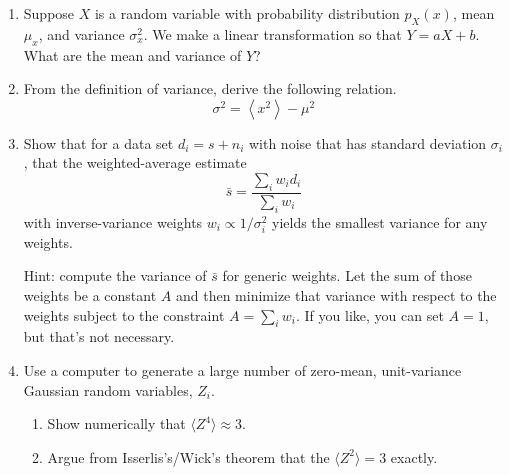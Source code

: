 \begin{enumerate}

\item Suppose $X$ is a random variable with probability distribution $p_X(x)$, mean $\mu_x$, and variance $\sigma_x^2$.  We make a linear transformation so that $Y = a X + b$.  What are the mean and variance of $Y$?

\item From the definition of variance, derive the following relation.
  \begin{equation}
    \sigma^2 = \left\langle x^2\right\rangle - \mu^2  \label{eq:var_alt}
  \end{equation}
 
\item \label{ex:minvar_est} Show that for a data set $d_i = s + n_i$ with noise that has standard deviation $\sigma_i$, that the weighted-average estimate
  \begin{equation*}
    \bar s = \frac{\sum_i w_i d_i}{\sum_i w_i}
  \end{equation*}
with inverse-variance weights $w_i \propto 1/\sigma^2_i$ yields the smallest variance for any weights.

Hint: compute the variance of $\bar s$ for generic weights.  Let the sum of those weights be a constant $A$ and then minimize that variance with respect to the weights subject to the constraint $A = \sum_i w_i$. If you like, you can set $A=1$, but that's not necessary. 

\item Use a computer to generate a large number of zero-mean, unit-variance Gaussian random variables, $Z_i$.  \begin{enumerate}
\item  Show numerically that $\langle Z^4 \rangle \approx 3$.  
\item Argue from Isserlis's/Wick's theorem that the  $\langle Z^2 \rangle = 3$ exactly.
\end{enumerate}




\end{enumerate}
